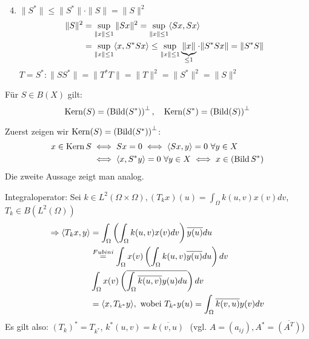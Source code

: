 \begin{beweis}
	\begin{enumerate}[label=\alph*\upshape)]
		\setcounter{enumi}{3}
		\item $\| S^{*} \|  \leq \| S^{*} \| \cdot \| S \| = \| S \|^{2}$
			\begin{align*}
				\| S \|^{2} & = \sup_{\| x \| \leq 1} \| S x \|^{2} = \sup_{\| x \| \leq 1}  \langle S x , S x \rangle \\
					& = \sup_{\| x \| \leq 1} \langle x , S^{*} S x \rangle \leq \sup_{\| x \| \leq 1}  \underbrace{\| x \|}_{\leq 1} \cdot \| S^{*} S x \| = \| S^{*} S \|
			\end{align*}
			$T = S^{*} \colon \| S S^{*} \| = \| T^{*} T \| = \| T \|^{2} = \| S^{*} \|^{2} = \| S \|^{2}$
	\end{enumerate}
\end{beweis}


\begin{kor}
	Für $S \in B(X)$ gilt:
	\[ \mathop{\rm Kern}\nolimits(S) = \left( \mathop{\rm Bild}\nolimits(S^{*}) \right)^{\bot}, \quad \mathop{\rm Kern}\nolimits(S^{*}) = \left( \mathop{\rm Bild}\nolimits(S) \right)^{\bot} \]	
\end{kor}

\begin{beweis}
	Zuerst zeigen wir $\mathop{\rm Kern}\nolimits(S) = \left( \mathop{\rm Bild}\nolimits(S^{*}) \right)^{\bot}$:
	\begin{align*}
		x \in \mathop{\rm Kern}\nolimits S & \iff S x = 0 \iff \langle S x , y \rangle = 0  ~ \forall y \in X \\
			& \iff \langle x , S^{*} y \rangle = 0 ~\forall y \in X \iff x \in \left( \mathop{\rm Bild}\nolimits S^{*} \right)
	\end{align*}
	Die zweite Aussage zeigt man analog.
\end{beweis}


\begin{beispiel}
	Integraloperator: Sei $k \in L^{2}( \Omega \times \Omega), (T_{k}x)(u) = \int_{\Omega} k(u, v) x(v) dv$, $T_{k} \in B(L^{2}(\Omega))$
	\begin{align*}
		\Rightarrow \langle T_{k} x , y \rangle & = \int_{\Omega} \left( \int_{\Omega} k(u, v) x(v) dv \right) \overline{y(u)} du \\
			& \overset{Fubini}{=} \int_{\Omega} x(v) \left( \int_{\Omega} k(u, v)\overline{y(u)} du \right) dv \\
			& \int_{\Omega} x(v) \left( \overline{ \int_{\Omega} \overline{k(u, v)} y(u) du} \right) dv \\
			& = \langle x , T_{k^{*}} y \rangle, \text{ wobei } T_{k^{*}} y(u) = \int_{\Omega} \overline{k(v, u)} y(v) dv
	\end{align*}
	Es gilt also: $\left( T_{k} \right)^{*} = T_{k^{*}}$, $k^{*}(u, v) = \overline{k(v, u)}$ $ $ (vgl. $A = (a_{ij}), A^{*} = \overline{(A^{T})}$)
\end{beispiel}


